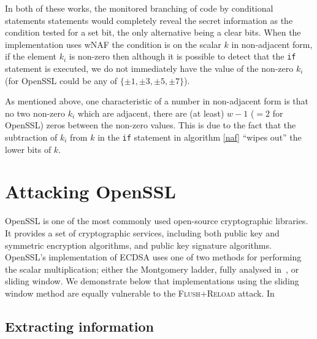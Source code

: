 \documentclass[twocolumn]{article}
\newcommand{\fl}{\textsc{Flu\-sh+\allowbreak Re\-load}\xspace}
\newcommand{\myupcase}[1]{\uppercase{#1}}
\begin{document}

In both of these works, the monitored branching of code by conditional statements statements would completely reveal the secret information as the condition tested for a set bit, the only alternative being a clear bits. When the implementation uses wNAF the condition is on the scalar $k$ in non-adjacent form, if the element $k_i$ is non-zero then although it is possible to detect that the \texttt{if} statement is executed, we do not immediately have the value of the non-zero $k_i$ (for OpenSSL could be any of $\{\pm1,\pm3,\pm5,\pm7\}$).



As mentioned above, one characteristic of a number in non-adjacent form is that no two non-zero $k_i$ which are adjacent, there are (at least) $w-1$ ($=2$ for OpenSSL) zeros between the non-zero values. This is due to the fact that the subtraction of $k_i$ from $k$ in the \texttt{if} statement in algorithm \ref{naf} ``wipes out'' the lower bits of $k$. 


\section{Attacking OpenSSL}\label{sec:attack}
OpenSSL is one of the most commonly used  open-source cryptographic libraries. It provides a set of cryptographic services, including both public key and symmetric encryption algorithms, and public key signature algorithms.
OpenSSL's implementation of \myupcase{ecdsa} uses one of two methods for performing the scalar multiplication; either the Montgomery ladder, fully analysed in~\cite{yarom_benger_2013}, or sliding window. We demonstrate below that implementations using the sliding window method are equally vulnerable to the \fl attack. In 

\subsection{Extracting information}\label{sub:obtain_info}
\end{document}
